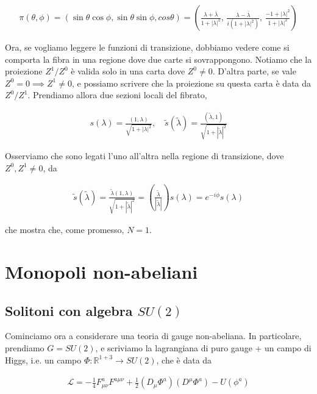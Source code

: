 \documentclass{report}
\begin{document}
\begin{align}
    \pi(\theta, \phi) = (\sin\theta \cos\phi, \sin\theta \sin \phi, cos\theta) = \left(\frac{\lambda +\bar{\lambda}}{1+|\lambda|^2}, \, \frac{\lambda - \bar{\lambda}}{i(1+|\lambda|^2)}, \, \frac{-1 + |\lambda|^2}{1+|\lambda|^2} \right)
\end{align}

Ora, se vogliamo leggere le funzioni di transizione, dobbiamo vedere come si comporta la fibra in una regione dove due carte si sovrappongono. Notiamo che la proiezione \(Z^1/Z^0\) è valida solo in una carta dove \(Z^0 \neq 0\). D'altra parte, se vale \(Z^0 = 0 \implies Z^1 \neq 0\), e possiamo scrivere che la proiezione su questa carta è data da \(Z^0/Z^1\). Prendiamo allora due sezioni locali del fibrato, 

\begin{align}
    s(\lambda) = \frac{(1, \lambda)}{\sqrt{1+|\lambda|^2}}, \quad \tilde{s}(\tilde{\lambda}) = \frac{(\tilde{\lambda},1)}{\sqrt{1+|\tilde{\lambda}|^2}}
\end{align}

Osserviamo che sono legati l'uno all'altra nella regione di transizione, dove \(Z^0, Z^1 \neq 0\), da 

\begin{align}
    \tilde{s}(\tilde{\lambda}) = \frac{\tilde{\lambda}(1, \lambda)}{\sqrt{1+|\tilde{\lambda}|^2}} = \left(\frac{\tilde{\lambda}}{|\tilde{\lambda}|} \right)s(\lambda) = e^{-i\phi}s(\lambda)
\end{align}

che mostra che, come promesso, \(N=1\). 

\section{Monopoli non-abeliani}

\subsection{Solitoni con algebra \(SU(2)\)}

Cominciamo ora a considerare una teoria di gauge non-abeliana. In particolare, prendiamo \(G = SU(2)\), e scriviamo la lagrangiana di puro gauge + un campo di Higgs, i.e. un campo \(\Phi : \mathbb{R}^{1+3} \rightarrow SU(2)\), che è data da 

\begin{align}
    \mathcal{L} = -\frac{1}{4}F^a_{\mu\nu}F^{a\mu\nu} + \frac{1}{2}(D_\mu \Phi^a)(D^\mu \Phi^a) - U(\phi^a)
\end{align}
\end{document}
